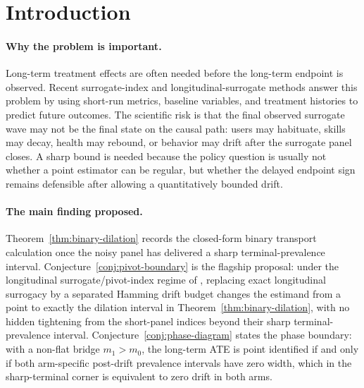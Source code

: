 \documentclass[11pt]{article}
\theoremstyle{definition}
\theoremstyle{plain}
\theoremstyle{remark}
\begin{document}
\section{Introduction}
\paragraph{Why the problem is important.}
Long-term treatment effects are often needed before the long-term endpoint is observed.  Recent surrogate-index and longitudinal-surrogate methods answer this problem by using short-run metrics, baseline variables, and treatment histories to predict future outcomes.  The scientific risk is that the final observed surrogate wave may not be the final state on the causal path: users may habituate, skills may decay, health may rebound, or behavior may drift after the surrogate panel closes.  A sharp bound is needed because the policy question is usually not whether a point estimator can be regular, but whether the delayed endpoint sign remains defensible after allowing a quantitatively bounded drift.

\paragraph{The main finding proposed.}
Theorem~\ref{thm:binary-dilation} records the closed-form binary transport calculation once the noisy panel has delivered a sharp terminal-prevalence interval.  Conjecture~\ref{conj:pivot-boundary} is the flagship proposal: under the longitudinal surrogate/pivot-index regime of \citet{HuangWangYuanZhaoZhang2026}, replacing exact longitudinal surrogacy by a separated Hamming drift budget changes the estimand from a point to exactly the dilation interval in Theorem~\ref{thm:binary-dilation}, with no hidden tightening from the short-panel indices beyond their sharp terminal-prevalence interval.  Conjecture~\ref{conj:phase-diagram} states the phase boundary: with a non-flat bridge \(m_1>m_0\), the long-term ATE is point identified if and only if both arm-specific post-drift prevalence intervals have zero width, which in the sharp-terminal corner is equivalent to zero drift in both arms.
\end{document}
